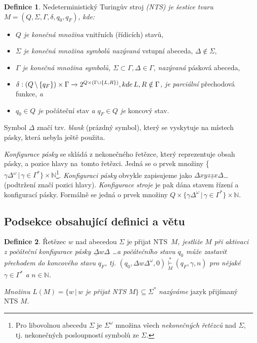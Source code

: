 \documentclass[a4paper, 11pt, twocolumn]{article}
\theoremstyle{definition}
\newtheorem{definition}{Definice}
\theoremstyle{plain}
\begin{document}
\begin{definition}
\label{d1.1} Nedeterministický Turingův stroj \emph{(NTS) je šestice tvaru $M = (Q, \Sigma, \Gamma, \delta, q_0, q_F)$, kde:} 
\begin{itemize}
    \item \emph{$Q$ je konečná množina} vnitřních (řídicích) stavů,
    \item \emph{$\Sigma$ je konečná množina symbolů nazývaná} vstupní abeceda, ${\Delta \notin \Sigma}$,
    \item \emph{$\Gamma$ je konečná množina symbolů, ${\Sigma  \subset  \Gamma, \Delta \in \Gamma}$, \mbox{nazývaná}} pásková abeceda,
    \item \emph{$\delta : (Q \, \symbol{92} \, \{q_F\}) \times \Gamma \xrightarrow \, 2^{Q \times (\Gamma \cup\{L, R\})}, kde \, L, R \notin \Gamma$, je parciální} přechodová funkce, \emph{a}
    \item \emph{$q_0 \in Q$ je} počáteční stav \emph{a $q_F \in Q$ je} koncový stav.
\end{itemize}

Symbol $\Delta$ značí tzv. \emph{blank} (prázdný symbol), který se vyskytuje na místech pásky, která nebyla ještě použita.

\emph{Konfigurace pásky} se skládá z nekonečného řetězce, který reprezentuje obsah pásky, a pozice hlavy na~tomto řetězci. Jedná se o prvek množiny \{$\gamma \Delta^\omega \, | \, \gamma \in \Gamma^\ast\} \times \mathbb{N}$\footnote{Pro libovolnou abecedu $\Sigma$ je $\Sigma^\omega$ množina všech \emph{nekonečných řetězců} nad $\Sigma$, tj. nekonečných posloupností symbolů ze $\Sigma$.}.
\emph{Konfiguraci pásky} obvykle zapisujeme jako $\Delta xyz\underline{z}x\Delta$\dots \\ (podtržení značí pozici hlavy).
\emph{Konfigurace stroje} je pak dána stavem řízení a konfigurací pásky. Formálně se jedná o prvek množiny $Q \times \{\gamma \Delta^\omega \, | \, \gamma \in \Gamma^\ast\} \times \mathbb{N}$.
\end{definition}
\subsection{Podsekce obsahující definici a větu}
\begin{definition}
\label{d1} Řetězec $w$ nad abecedou $\Sigma$ je přijat NTS~\emph{$M$, jestliže $M$ při aktivaci z počáteční konfigurace pásky $\underline{\Delta} w \Delta$ \dots a počátečního stavu $q_0$ může zastavit přechodem do koncového stavu $q_F$, tj. $(q_0, \Delta w \Delta^\omega, 0) \underset{M}{\overset{\ast}{\vdash}} (q_F, \gamma, n)$  pro nějaké $\gamma \in \Gamma^\ast$ a $n \in \mathbb{N}$}.

\emph{Množinu $L(M) = \{w \, | \, w$ je přijat NTS $M \} \subseteq \Sigma^\ast$ nazýváme} jazyk přijímaný NTS $M$.
\end{definition}
\end{document}
